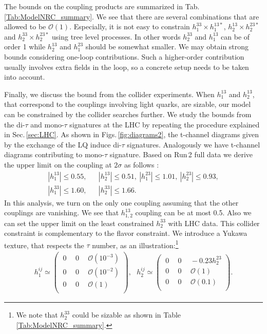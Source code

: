 \documentclass[12pt, a4paper]{article}
\numberwithin{equation}{section} %
\newcommand{\1}{\mbox{1}\hspace{-0.25em}\mbox{l}}
\begin{document}
The bounds on the coupling products are summarized 
in Tab.\,\ref{Tab:ModelNRC_summary}.
We see that there are several combinations that are allowed to be $\mathcal{O}(1)$.
Especially, it is not easy to constrain $h_1^{33}\times h_1^{13*}$, $h_2^{13}\times h_2^{23*}$ and $h_2^{33}\times h_2^{23*}$ using tree level processes.
In other words $h_{2}^{33}$ and $h_1^{13}$ can be of order 1 while $h_2^{13}$ and $h_1^{23}$ should be somewhat smaller.
We may obtain strong bounds considering one-loop contributions.
Such a higher-order contribution usually involves extra fields in the loop, so 
a concrete setup needs to be taken into account.

Finally, we discuss the bound from the collider experiments.
When $h_1^{13}$ and $h_2^{13}$, that correspond to the couplings involving light quarks, are sizable, our model 
can be constrained by the collider searches further.
We study the bounds from the di-$\tau$ and mono-$\tau$ signatures at the LHC by repeating the procedure explained in Sec.\,\ref{sec:LHC}.
As shown in Figs.\,\ref{fig:diagrams2}, the t-channel diagrams given by the exchange of the LQ induce di-$\tau$ signatures.
Analogously we have t-channel diagrams contributing to mono-$\tau$ signature.
Based on Run\,2 full data  we derive the upper limit on the coupling at $2\sigma$ as follows :
\begin{eqnarray}
|h_1^{13}|\le0.55,&& |h_2^{13}|\le0.51,~ |h_1^{23}|\le1.01,~ |h_2^{23}|\le0.93, \nonumber \\ |h_1^{33}|\le1.60,&& |h_2^{33}|\le1.66.
\end{eqnarray}
In this analysis, we turn on the only one coupling assuming that the other couplings are vanishing.
We see that $h_{1,2}^{13}$ coupling can be at most 0.5.
Also we can set the upper limit on the least constrained $h_2^{33}$ with LHC data.
This collider constraint is complementary to the flavor constraint.
We introduce a Yukawa texture, that respects the $\tau$ number, as an illustration:\footnote{We note that $h^{33}_{2}$ could be sizable as shown in Table \ref{Tab:ModelNRC_summary}.}
\begin{eqnarray}
  h_1^{ij} \simeq\left(
  \begin{array}{ccc}
   ~0~&~0~&~\mathcal{O}(10^{-3})\\
   ~0~&~0~&~\mathcal{O}(10^{-2})\\
   ~0~&~0~&~\mathcal{O}(1)\\
  \end{array}
  \right),~~~h_2^{ij} \simeq\left(
  \begin{array}{ccc}
   ~0~&~0~&~-0.23 h_2^{23}\\
   ~0~&~0~&~\mathcal{O}(1)\\
   ~0~&~0~&~\mathcal{O}(0.1) \\
  \end{array}
  \right).
\label{eq:coupling_structure_2023}
\end{eqnarray}
\end{document}
